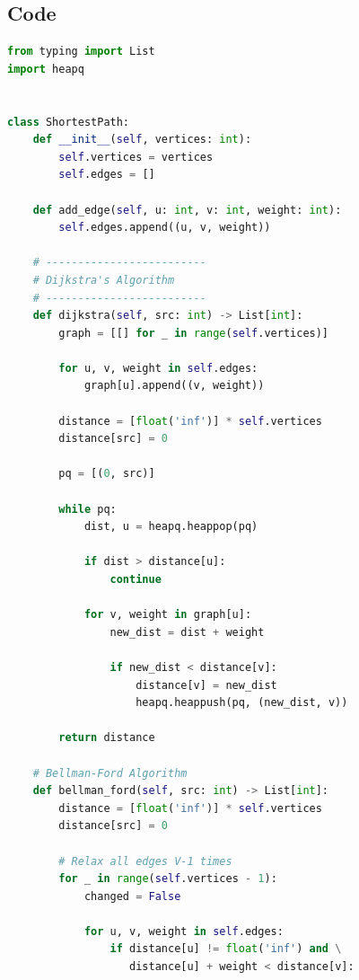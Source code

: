 

\subsection*{Code}


\begin{lstlisting}[language=python]
from typing import List
import heapq


class ShortestPath:
    def __init__(self, vertices: int):
        self.vertices = vertices
        self.edges = []

    def add_edge(self, u: int, v: int, weight: int):
        self.edges.append((u, v, weight))

    # -------------------------
    # Dijkstra's Algorithm
    # -------------------------
    def dijkstra(self, src: int) -> List[int]:
        graph = [[] for _ in range(self.vertices)]

        for u, v, weight in self.edges:
            graph[u].append((v, weight))

        distance = [float('inf')] * self.vertices
        distance[src] = 0

        pq = [(0, src)]

        while pq:
            dist, u = heapq.heappop(pq)

            if dist > distance[u]:
                continue

            for v, weight in graph[u]:
                new_dist = dist + weight

                if new_dist < distance[v]:
                    distance[v] = new_dist
                    heapq.heappush(pq, (new_dist, v))

        return distance
  
    # Bellman-Ford Algorithm
    def bellman_ford(self, src: int) -> List[int]:
        distance = [float('inf')] * self.vertices
        distance[src] = 0

        # Relax all edges V-1 times
        for _ in range(self.vertices - 1):
            changed = False

            for u, v, weight in self.edges:
                if distance[u] != float('inf') and \
                   distance[u] + weight < distance[v]:


\end{lstlisting}
